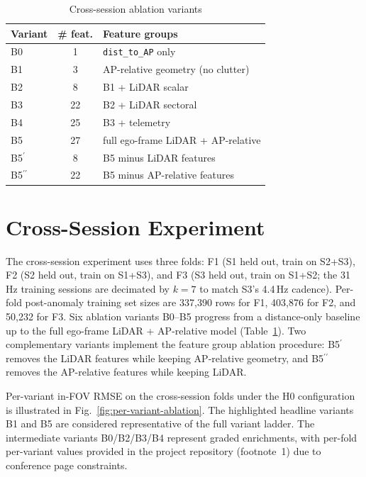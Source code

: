 \documentclass[conference]{IEEEtran}
\begin{document}
\begin{table}[t]
    \caption{Cross-session ablation variants}
    \label{tab:b-variants}
    \centering
    \setlength{\tabcolsep}{4pt}
    \footnotesize
    \begin{tabular}{l c l}
        \toprule
        Variant & \# feat. & Feature groups \\
        \midrule
        B0 & 1  & \texttt{dist\_to\_AP} only \\
        B1 & 3  & AP-relative geometry (no clutter) \\
        B2 & 8  & B1 + LiDAR scalar \\
        B3 & 22 & B2 + LiDAR sectoral \\
        B4 & 25 & B3 + telemetry \\
        B5 & 27 & full ego-frame LiDAR + AP-relative \\
        B5$^\prime$ & 8 & B5 minus LiDAR features \\
        B5$^{\prime\prime}$ & 22 & B5 minus AP-relative features \\
        \bottomrule
    \end{tabular}
    \vspace{-8pt}
\end{table}

\section{Cross-Session Experiment}
\label{sec:cross-session}

The cross-session experiment uses three folds: F1 (S1 held out, train on S2+S3), F2 (S2 held out, train on S1+S3), and F3 (S3 held out, train on S1+S2; the 31\,Hz training sessions are decimated by $k = 7$ to match S3's 4.4\,Hz cadence). Per-fold post-anomaly training set sizes are 337{,}390 rows for F1, 403{,}876 for F2, and 50{,}232 for F3. Six ablation variants B0--B5 progress from a distance-only baseline up to the full ego-frame LiDAR + AP-relative model (Table~\ref{tab:b-variants}). 
Two complementary variants implement the feature group ablation procedure: B5$^\prime$ removes the LiDAR features while keeping AP-relative geometry, and B5$^{\prime\prime}$ removes the AP-relative features while keeping LiDAR.

Per-variant in-FOV RMSE on the cross-session folds under the H0 configuration is illustrated in Fig.~\ref{fig:per-variant-ablation}. The highlighted headline variants B1 and B5 are considered representative of the full variant ladder. The intermediate variants B0/B2/B3/B4 represent graded enrichments, with per-fold per-variant values provided in the project repository (footnote~1) due to conference page constraints.
\end{document}
